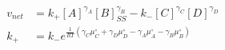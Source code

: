 \begin{eqnarray}
v_{net} & = k_+[A]^{\gamma_A}[B]_{SS}^{\gamma_B} - k_-[C]^{\gamma_C}[D]^{\gamma_D} \\
k_+ &=  k_-e^{\frac{1}{RT}\left(\gamma_C\mu_C^\circ+ \gamma_D\mu_D^\circ -\gamma_A\mu_A^\circ-\gamma_B\mu_B^\circ\right)} \\
\end{eqnarray}